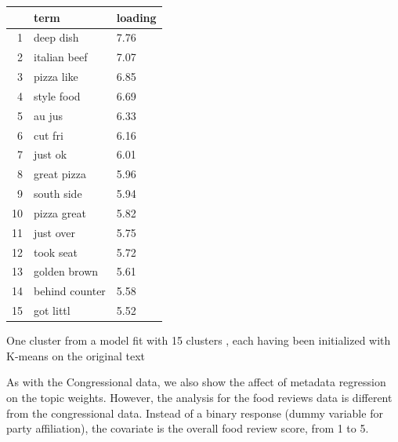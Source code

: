 \documentclass[12pt]{article}
\begin{document}
\begin{table}[ht]
\centering
\begin{threeparttable}
\begin{tabular}{rll}
  \hline
 & term & loading \\ 
  \hline
1 & deep dish & 7.76 \\ 
  2 & italian beef & 7.07 \\ 
  3 & pizza like & 6.85 \\ 
  4 & style food & 6.69 \\ 
  5 & au jus & 6.33 \\ 
  6 & cut fri & 6.16 \\ 
  7 & just ok & 6.01 \\ 
  8 & great pizza & 5.96 \\ 
  9 & south side & 5.94 \\ 
  10 & pizza great & 5.82 \\ 
  11 & just over & 5.75 \\ 
  12 & took seat & 5.72 \\ 
  13 & golden brown & 5.61 \\ 
  14 & behind counter & 5.58 \\ 
  15 & got littl & 5.52 \\ 
   \hline
\end{tabular}
\begin{tablenotes}
\small
\item One cluster from a model fit with 15 clusters , each having been initialized with K-means on the original text
\end{tablenotes}
\end{threeparttable}
\end{table}


As with the Congressional data, we also show the affect of metadata regression on the topic weights. However, the analysis for the food reviews data is different from the congressional data. Instead of a binary response (dummy variable for party affiliation), the covariate is the overall food review score, from 1 to 5.
\end{document}
